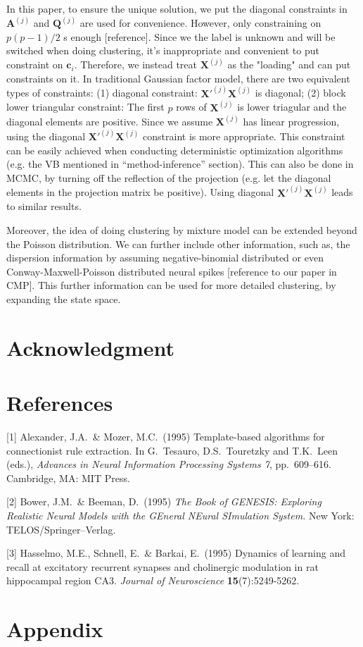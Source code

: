 \documentclass{article}
\begin{document}
	In this paper, to ensure the unique solution, we put the diagonal constraints in $\bm{A}^{(j)}$ and $\bm{Q}^{(j)}$ are used for convenience. However, only constraining on $p(p-1)/2$ s enough [reference]. Since we the label is unknown and will be switched when doing clustering, it’s inappropriate and convenient to put constraint on $\bm{c}_i$. Therefore, we instead treat $\bm{X}^{(j)}$ as the "loading" and can put constraints on it. In traditional Gaussian factor model, there are two equivalent types of constraints: (1) diagonal constraint: $\bm{X}'^{(j)}\bm{X}^{(j)}$ is diagonal; (2) block lower triangular constraint: The first $p$ rows of $\bm{X}^{(j)}$ is lower triagular and the diagonal elements are positive. Since we assume $\bm{X}^{(j)}$ has linear progression, using the diagonal $\bm{X}'^{(j)}\bm{X}^{(j)}$ constraint is more appropriate. This constraint can be easily achieved when conducting deterministic optimization algorithms (e.g. the VB mentioned in “method-inference” section). This can also be done in MCMC, by turning off the reflection of the projection (e.g. let the diagonal elements in the projection matrix be positive). Using diagonal $\bm{X}'^{(j)}\bm{X}^{(j)}$  leads to similar results.
	
	Moreover, the idea of doing clustering by mixture model can be extended beyond the Poisson distribution. We can further include other information, such as, the dispersion information by assuming negative-binomial distributed or even Conway-Maxwell-Poisson distributed neural spikes [reference to our paper in CMP]. This further information can be used for more detailed clustering, by expanding the state space.
	
	\section*{Acknowledgment}
	
	\section*{References}
	
	
	{
		\small
		
		[1] Alexander, J.A.\ \& Mozer, M.C.\ (1995) Template-based algorithms for
		connectionist rule extraction. In G.\ Tesauro, D.S.\ Touretzky and T.K.\ Leen
		(eds.), {\it Advances in Neural Information Processing Systems 7},
		pp.\ 609--616. Cambridge, MA: MIT Press.
		
		[2] Bower, J.M.\ \& Beeman, D.\ (1995) {\it The Book of GENESIS: Exploring
			Realistic Neural Models with the GEneral NEural SImulation System.}  New York:
		TELOS/Springer--Verlag.
		
		[3] Hasselmo, M.E., Schnell, E.\ \& Barkai, E.\ (1995) Dynamics of learning and
		recall at excitatory recurrent synapses and cholinergic modulation in rat
		hippocampal region CA3. {\it Journal of Neuroscience} {\bf 15}(7):5249-5262.
	}
	
	
	\appendix
	
	\section{Appendix}
	
	
	
\end{document}
